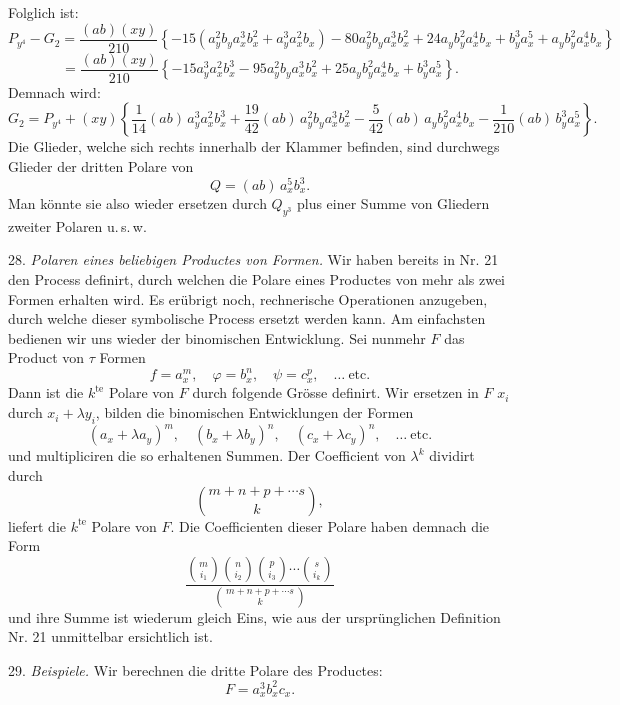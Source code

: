 Folglich ist:
\[
P_{y^4} - G_2 = \frac{(ab)(xy)}{210} \left\{ -15 \left( a_y^2 b_y a_x^3 b_x^2 + a_y^3 a_x^2 b_x \right) - 80 a_y^2 b_y a_x^3 b_x^2 + 24 a_y b_y^2 a_x^4 b_x + b_y^3 a_x^5 + a_y b_y^2 a_x^4 b_x \right\}
\]
\[
= \frac{(ab)(xy)}{210} \left\{ -15 a_y^3 a_x^2 b_x^3 - 95 a_y^2 b_y a_x^3 b_x^2 + 25 a_y b_y^2 a_x^4 b_x + b_y^3 a_x^5 \right\} .
\]
Demnach wird:
\[
G_2 = P_{y^4} + (xy) \left\{ \frac{1}{14} (ab)\, a_y^3 a_x^2 b_x^3 + \frac{19}{42} (ab)\, a_y^2 b_y a_x^3 b_x^2 - \frac{5}{42} (ab)\, a_y b_y^2 a_x^4 b_x - \frac{1}{210} (ab)\, b_y^3 a_x^5 \right\} .
\]
Die Glieder, welche sich rechts innerhalb der Klammer befinden, sind durchwegs Glieder der dritten Polare von
\[
Q = (ab)\, a_x^5 b_x^3 .
\]
Man könnte sie also wieder ersetzen durch $Q_{y^3}$ plus einer Summe von Gliedern zweiter Polaren u.\,s.\,w.

28. \textit{Polaren eines beliebigen Productes von Formen.} Wir haben bereits in Nr. 21 den Process definirt, durch welchen die Polare eines Productes von mehr als zwei Formen erhalten wird. Es erübrigt noch, rechnerische Operationen anzugeben, durch welche dieser symbolische Process ersetzt werden kann. Am einfachsten bedienen wir uns wieder der binomischen Entwicklung. Sei nunmehr $F$ das Product von $\tau$ Formen
\[
f = a_x^m, \quad \varphi = b_x^n, \quad \psi = c_x^p, \quad \ldots \ \text{etc.}
\]
Dann ist die $k^{\text{te}}$ Polare von $F$ durch folgende Grösse definirt. Wir ersetzen in $F$ $x_i$ durch $x_i + \lambda y_i$, bilden die binomischen Entwicklungen der Formen
\[
(a_x + \lambda a_y)^m, \quad (b_x + \lambda b_y)^n, \quad (c_x + \lambda c_y)^n, \quad \ldots \ \text{etc.}
\]
und multipliciren die so erhaltenen Summen. Der Coefficient von $\lambda^k$ dividirt durch
\[
\binom{m+n+p+\cdots s}{k} ,
\]
liefert die $k^{\text{te}}$ Polare von $F$. Die Coefficienten dieser Polare haben demnach die Form
\[
\frac{\binom{m}{i_1}\binom{n}{i_2}\binom{p}{i_3}\cdots\binom{s}{i_k}}{\binom{m+n+p+\cdots s}{k}} %
\]
und ihre Summe ist wiederum gleich Eins, wie aus der ursprünglichen Definition Nr. 21 unmittelbar ersichtlich ist.

29. \textit{Beispiele.} Wir berechnen die dritte Polare des Productes:
\[
F = a_x^3 b_x^2 c_x .
\]


